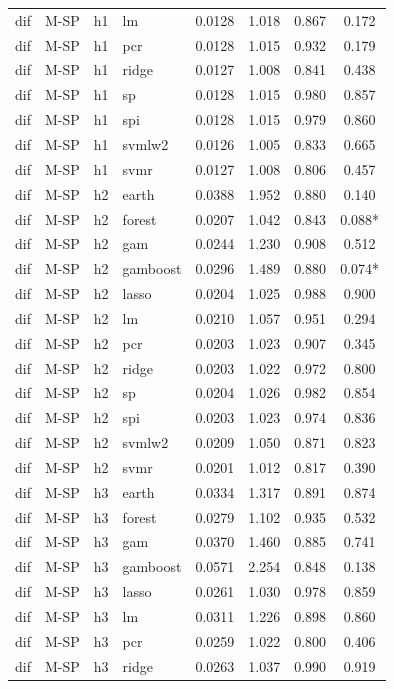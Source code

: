 \begin{ThreePartTable}
\begin{longtable}[t]{llclcccc}
dif & M-SP & h1 & lm & 0.0128 & 1.018 & 0.867 & 0.172\\
dif & M-SP & h1 & pcr & 0.0128 & 1.015 & 0.932 & 0.179\\
dif & M-SP & h1 & ridge & 0.0127 & 1.008 & 0.841 & 0.438\\
dif & M-SP & h1 & sp & 0.0128 & 1.015 & 0.980 & 0.857\\
dif & M-SP & h1 & spi & 0.0128 & 1.015 & 0.979 & 0.860\\
dif & M-SP & h1 & svmlw2 & 0.0126 & 1.005 & 0.833 & 0.665\\
dif & M-SP & h1 & svmr & 0.0127 & 1.008 & 0.806 & 0.457\\
\addlinespace
dif & M-SP & h2 & earth & 0.0388 & 1.952 & 0.880 & 0.140\\
dif & M-SP & h2 & forest & 0.0207 & 1.042 & 0.843 & 0.088*\\
dif & M-SP & h2 & gam & 0.0244 & 1.230 & 0.908 & 0.512\\
dif & M-SP & h2 & gamboost & 0.0296 & 1.489 & 0.880 & 0.074*\\
dif & M-SP & h2 & lasso & 0.0204 & 1.025 & 0.988 & 0.900\\
dif & M-SP & h2 & lm & 0.0210 & 1.057 & 0.951 & 0.294\\
dif & M-SP & h2 & pcr & 0.0203 & 1.023 & 0.907 & 0.345\\
dif & M-SP & h2 & ridge & 0.0203 & 1.022 & 0.972 & 0.800\\
dif & M-SP & h2 & sp & 0.0204 & 1.026 & 0.982 & 0.854\\
dif & M-SP & h2 & spi & 0.0203 & 1.023 & 0.974 & 0.836\\
dif & M-SP & h2 & svmlw2 & 0.0209 & 1.050 & 0.871 & 0.823\\
dif & M-SP & h2 & svmr & 0.0201 & 1.012 & 0.817 & 0.390\\
\addlinespace
dif & M-SP & h3 & earth & 0.0334 & 1.317 & 0.891 & 0.874\\
dif & M-SP & h3 & forest & 0.0279 & 1.102 & 0.935 & 0.532\\
dif & M-SP & h3 & gam & 0.0370 & 1.460 & 0.885 & 0.741\\
dif & M-SP & h3 & gamboost & 0.0571 & 2.254 & 0.848 & 0.138\\
dif & M-SP & h3 & lasso & 0.0261 & 1.030 & 0.978 & 0.859\\
dif & M-SP & h3 & lm & 0.0311 & 1.226 & 0.898 & 0.860\\
dif & M-SP & h3 & pcr & 0.0259 & 1.022 & 0.800 & 0.406\\
dif & M-SP & h3 & ridge & 0.0263 & 1.037 & 0.990 & 0.919\\

\end{longtable}
\end{ThreePartTable}
